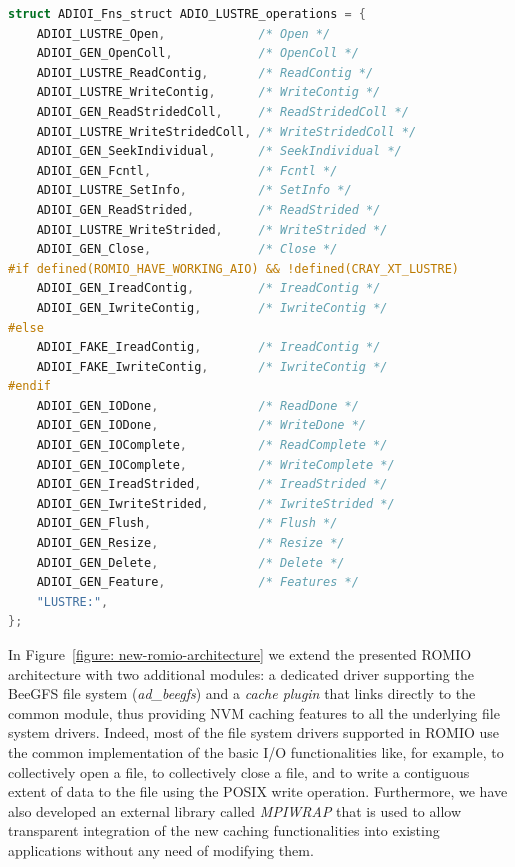 \begin{lstlisting}[language=C, caption=Operation table for Lustre driver., label={list: lustre_table}]
struct ADIOI_Fns_struct ADIO_LUSTRE_operations = {
    ADIOI_LUSTRE_Open,             /* Open */
    ADIOI_GEN_OpenColl,            /* OpenColl */
    ADIOI_LUSTRE_ReadContig,       /* ReadContig */
    ADIOI_LUSTRE_WriteContig,      /* WriteContig */
    ADIOI_GEN_ReadStridedColl,     /* ReadStridedColl */
    ADIOI_LUSTRE_WriteStridedColl, /* WriteStridedColl */
    ADIOI_GEN_SeekIndividual,      /* SeekIndividual */
    ADIOI_GEN_Fcntl,               /* Fcntl */
    ADIOI_LUSTRE_SetInfo,          /* SetInfo */
    ADIOI_GEN_ReadStrided,         /* ReadStrided */
    ADIOI_LUSTRE_WriteStrided,     /* WriteStrided */
    ADIOI_GEN_Close,               /* Close */
#if defined(ROMIO_HAVE_WORKING_AIO) && !defined(CRAY_XT_LUSTRE)
    ADIOI_GEN_IreadContig,         /* IreadContig */
    ADIOI_GEN_IwriteContig,        /* IwriteContig */
#else
    ADIOI_FAKE_IreadContig,        /* IreadContig */
    ADIOI_FAKE_IwriteContig,       /* IwriteContig */
#endif
    ADIOI_GEN_IODone,              /* ReadDone */
    ADIOI_GEN_IODone,              /* WriteDone */
    ADIOI_GEN_IOComplete,          /* ReadComplete */
    ADIOI_GEN_IOComplete,          /* WriteComplete */
    ADIOI_GEN_IreadStrided,        /* IreadStrided */
    ADIOI_GEN_IwriteStrided,       /* IwriteStrided */
    ADIOI_GEN_Flush,               /* Flush */
    ADIOI_GEN_Resize,              /* Resize */
    ADIOI_GEN_Delete,              /* Delete */
    ADIOI_GEN_Feature,             /* Features */
    "LUSTRE:",
};
\end{lstlisting}

In Figure~\ref{figure: new-romio-architecture} we extend the presented ROMIO architecture with two additional modules: a dedicated driver supporting the BeeGFS file system 
(\textit{ad\_beegfs}) and a \textit{cache plugin} that links directly to the common module, thus providing NVM caching features to all the underlying file system drivers. Indeed,
most of the file system drivers supported in ROMIO use the common implementation of the basic I/O functionalities like, for example,  to collectively 
open a file,  to collectively close a file, and  to write a contiguous extent of data to the file using the POSIX write 
operation. Furthermore, we have also developed an external library called \textit{MPIWRAP} that is used to allow transparent integration of the new caching functionalities into existing 
applications without any need of modifying them. 

